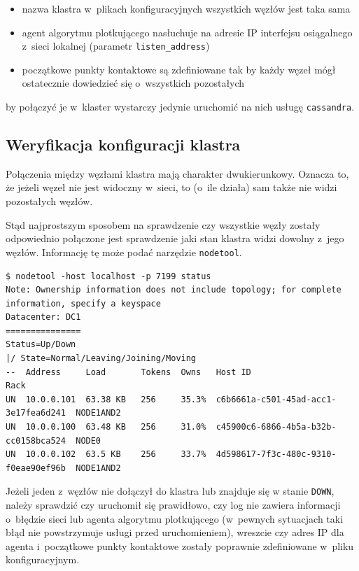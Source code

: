 \documentclass{article} %
\begin{document}
\begin{itemize}
\item nazwa klastra w~plikach konfiguracyjnych wszystkich węzłów jest taka sama
\item agent algorytmu plotkującego nasłuchuje na adresie IP interfejsu osiągalnego z~sieci lokalnej (parametr \texttt{listen\_address})
\item początkowe punkty kontaktowe są zdefiniowane tak by każdy węzeł mógł ostatecznie dowiedzieć się o~wszystkich pozostałych
\end{itemize}

by połączyć je w~klaster wystarczy jedynie uruchomić na nich usługę \texttt{cassandra}.

\subsection{Weryfikacja konfiguracji klastra}\label{subsec:cluster_verifying}

Połączenia między węzłami klastra mają charakter dwukierunkowy.
Oznacza to, że jeżeli węzeł nie jest widoczny w~sieci, to (o~ile działa) sam także nie widzi pozostałych węzłów.

Stąd najprostszym sposobem na sprawdzenie czy wszystkie węzły zostały odpowiednio połączone jest sprawdzenie jaki stan klastra widzi dowolny z~jego węzłów.
Informację tę może podać narzędzie \texttt{nodetool}.

\begin{lstlisting}[style=bash, caption={sprawdzanie stanu klastra po dołączeniu węzłów}]
$ nodetool -host localhost -p 7199 status
Note: Ownership information does not include topology; for complete information, specify a keyspace
Datacenter: DC1
===============
Status=Up/Down
|/ State=Normal/Leaving/Joining/Moving
--  Address     Load       Tokens  Owns   Host ID                               Rack
UN  10.0.0.101  63.38 KB   256     35.3%  c6b6661a-c501-45ad-acc1-3e17fea6d241  NODE1AND2
UN  10.0.0.100  63.48 KB   256     31.0%  c45900c6-6866-4b5a-b32b-cc0158bca524  NODE0
UN  10.0.0.102  63.5 KB    256     33.7%  4d598617-7f3c-480c-9310-f0eae90ef96b  NODE1AND2
\end{lstlisting}

Jeżeli jeden z~węzłów nie dołączył do klastra lub znajduje się w stanie \texttt{DOWN}, należy sprawdzić czy uruchomił się prawidłowo, czy log nie zawiera informacji o~błędzie sieci lub agenta algorytmu plotkującego (w~pewnych sytuacjach taki błąd nie powstrzymuje usługi przed uruchomieniem), wreszcie czy adres IP dla agenta i~początkowe punkty kontaktowe zostały poprawnie zdefiniowane w~pliku konfiguracyjnym.
\end{document}
